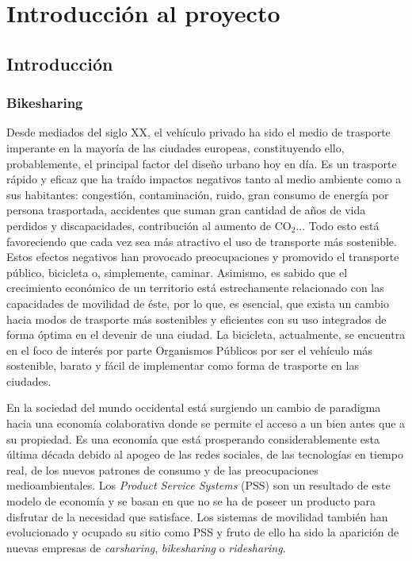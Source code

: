 \section{Introducción al proyecto}
\subsection{Introducción}
\subsubsection{Bikesharing}
Desde mediados del siglo XX, el vehículo privado ha sido el medio de trasporte imperante en la mayoría de las ciudades europeas, constituyendo ello, probablemente, el principal factor del diseño urbano hoy en día. Es un trasporte rápido y eficaz que ha traído impactos negativos tanto al medio ambiente como a sus habitantes: congestión, contaminación, ruido, gran consumo de energía por persona trasportada, accidentes que suman gran cantidad de años de vida perdidos y discapacidades, contribución al aumento de CO$_2$... Todo esto está favoreciendo que cada vez sea más atractivo el uso de transporte más sostenible. Estos efectos negativos han provocado preocupaciones y promovido el transporte público, bicicleta o, simplemente, caminar. Asimismo, es sabido que el crecimiento económico de un territorio está estrechamente relacionado con las capacidades de movilidad de éste, por lo que, es esencial, que exista un cambio hacia modos de trasporte más sostenibles y eficientes con su uso integrados de forma óptima en el devenir de una ciudad. La bicicleta, actualmente, se encuentra en el foco de interés por parte Organismos Públicos por ser el vehículo más sostenible, barato y fácil de implementar como forma de trasporte en las ciudades.
\newline

En la sociedad del mundo occidental está surgiendo un cambio de paradigma hacia una economía colaborativa donde se permite el acceso a un bien antes que a su propiedad. Es una economía que está prosperando considerablemente esta última década debido al apogeo de las redes sociales, de las tecnologías en tiempo real, de los nuevos patrones de consumo y de las preocupaciones medioambientales. Los \textit{Product Service Systems} (PSS) son un resultado de este modelo de economía y se basan en que no se ha de poseer un producto para disfrutar de la necesidad que satisface. Los sistemas de movilidad también han evolucionado y ocupado su sitio como PSS y fruto de ello ha sido la aparición de nuevas empresas de \textit{carsharing}, \textit{bikesharing} o \textit{ridesharing}.
\newline

